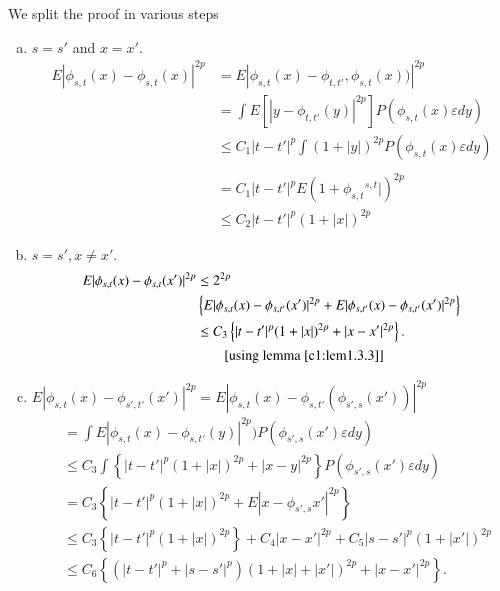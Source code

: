 We split the proof in various steps
\begin{enumerate}[(a)]
\item $s = s'$  and $x = x'$.
  \begin{align*}
    E |\phi_{s,t}{{(x)}} - \phi_{s,t}{{(x)}}|^{2p} & = E
    |\phi_{s,t}{{(x)}} - \phi_{t,t'}, \phi_{s,t}{{(x))}}|^{2p}\\ 
    & = \int E [|y -\phi_{t,t'}{{(y)}}|^{2p}] P(\phi_{s,t}{{(x)}}
    \varepsilon dy) \\ 
    & \le C_1 |t-t'|^p \int (1+ |y|)^{2p} P(\phi_{s,t}{{(x)}}
    \varepsilon dy) \\
     & \tag*{[using Lemma 1.3.4]}\\ 
    & = C_1 |t-t'|^p E(1+\phi_{s,t}{^{s,t}}|)^{2p}\\
    & \le  C_2 |t-t'|^p (1+|x|)^{2p}
  \end{align*}

\item $s = s', x \neq x'$.
  \begin{align*}
    E|\phi_{s,t}{{(x)}} - \phi_{s,t}{{(x')}}|^{2p} & \le 2^{2p}\\ 
    & \left\{
    E|\phi_{s,t}{{(x)}} - \phi_{s,t'}{{(x')}}|^{2p} +
    E|\phi_{s,t'}{{(x)}} - \phi_{s,t'}{{(x')}}|^{2p}\right\}\\ 
    & \le C_3 \left\{ |t-t'|^p (1+|x|)^{2p} + |x-x'|^{2p}\right\}.\\
    & \tag*{[using lemma~\ref{c1:lem1.3.3}]}
\end{align*}

\item $E|\phi_{s,t}{{(x)}}-  \phi_{s',t'}{{(x')}}|^{2p} =
  E|\phi_{s,t}{{(x)}} - \phi_{s,t'}(\phi_{s',s}(x'))|^{2p}$ 
  \begin{align*}
    &= \int E|\phi_{s,t}{{(x)}}- \phi_{s,t'}{{(y)}}|^{2p}) P
    (\phi_{s', s}{{(x')}} \varepsilon dy)\\ 
    & \le C_3 \int \left\{ |t-t'|^p (1+|x|)^{2p} + |x-y|^{2p}\right\} P
    (\phi_{s',s}{{(x')}} \varepsilon dy)\\ 
    & = C_3 \left\{ |t-t'|^p (1+|x|)^{2p} + E|x-\phi_{s',s}{{x'}}|^{2p}\right\}\\
    & \le C_3 \left\{ |t-t'|^p (1+|x|)^{2p}\right\} + C_4 |x-x'|^{2p} + C_5
    |s-s'|^p (1+|x'|)^{2p}\\ 
    & \le C_6 \left\{ (|t-t'|^p + |s-s'|^p) (1+|x|+|x'|)^{2p} +
    |x-x'|^{2p}\right\}. 
\end{align*}\pageoriginale
\end{enumerate}

